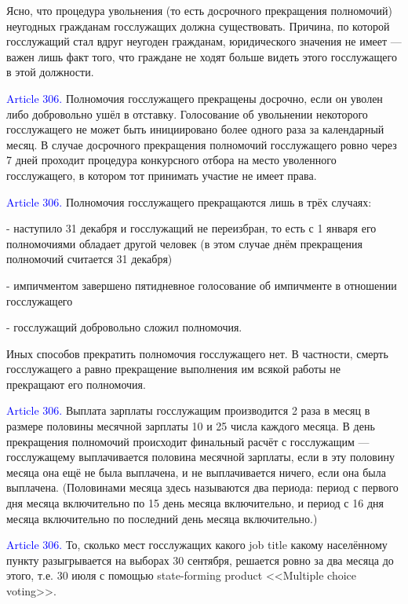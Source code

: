 \documentclass[11pt]{article}
\theoremstyle{remark}
\theoremstyle{definition}
\begin{document}
\color{blue}

Ясно, что процедура увольнения (то есть досрочного прекращения полномочий) неугодных гражданам госслужащих должна существовать. Причина, по которой госслужащий стал вдруг неугоден гражданам, юридического значения не имеет --- важен лишь факт того, что граждане не ходят больше видеть этого госслужащего в этой должности.


\color{black}


\textcolor{blue}{Article 306.} Полномочия госслужащего прекращены досрочно, если он уволен либо добровольно ушёл в отставку. Голосование об увольнении некоторого госслужащего не может быть инициировано более одного раза за календарный месяц. В случае досрочного прекращения полномочий госслужащего ровно через 7 дней проходит процедура конкурсного отбора на место уволенного госслужащего, в котором тот принимать участие не имеет права.



\textcolor{blue}{Article 306.} Полномочия госслужащего прекращаются лишь в трёх случаях:

- наступило 31 декабря и госслужащий не переизбран, то есть с 1 января его полномочиями обладает другой человек (в этом случае днём прекращения полномочий считается 31 декабря)

- импичментом завершено пятидневное голосование об импичменте в отношении госслужащего

- госслужащий добровольно сложил полномочия.

Иных способов прекратить полномочия госслужащего нет. В частности, смерть госслужащего а равно прекращение выполнения им всякой работы не прекращают его полномочия.



\textcolor{blue}{Article 306.} Выплата зарплаты госслужащим производится 2 раза в месяц в размере половины месячной зарплаты 10 и 25 числа каждого месяца. В день прекращения полномочий происходит финальный расчёт с госслужащим --- госслужащему выплачивается половина месячной зарплаты, если в эту половину месяца она ещё не была выплачена, и не выплачивается ничего, если она была выплачена. (Половинами месяца здесь называются два периода: период с первого дня месяца включительно по 15 день месяца включительно, и период с 16 дня месяца включительно по последний день месяца включительно.)








\textcolor{blue}{Article 306.} То, сколько мест госслужащих какого job title какому населённому пункту разыгрывается на выборах 30 сентября, решается ровно за два месяца до этого, т.е. 30 июля с помощью state-forming product <<Multiple choice voting>>.
\end{document}

